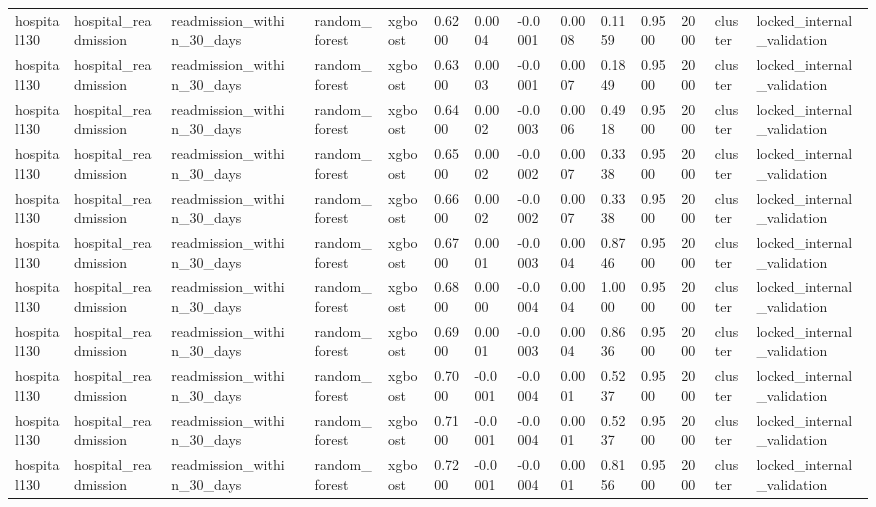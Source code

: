 \begin{tabular}{lllllllllllllll}
hospital130 & hospital\_readmission & readmission\_within\_30\_days &  & random\_forest & xgboost & 0.6200 & 0.0004 & -0.0001 & 0.0008 & 0.1159 & 0.9500 & 2000 & cluster & locked\_internal\_validation \\
hospital130 & hospital\_readmission & readmission\_within\_30\_days &  & random\_forest & xgboost & 0.6300 & 0.0003 & -0.0001 & 0.0007 & 0.1849 & 0.9500 & 2000 & cluster & locked\_internal\_validation \\
hospital130 & hospital\_readmission & readmission\_within\_30\_days &  & random\_forest & xgboost & 0.6400 & 0.0002 & -0.0003 & 0.0006 & 0.4918 & 0.9500 & 2000 & cluster & locked\_internal\_validation \\
hospital130 & hospital\_readmission & readmission\_within\_30\_days &  & random\_forest & xgboost & 0.6500 & 0.0002 & -0.0002 & 0.0007 & 0.3338 & 0.9500 & 2000 & cluster & locked\_internal\_validation \\
hospital130 & hospital\_readmission & readmission\_within\_30\_days &  & random\_forest & xgboost & 0.6600 & 0.0002 & -0.0002 & 0.0007 & 0.3338 & 0.9500 & 2000 & cluster & locked\_internal\_validation \\
hospital130 & hospital\_readmission & readmission\_within\_30\_days &  & random\_forest & xgboost & 0.6700 & 0.0001 & -0.0003 & 0.0004 & 0.8746 & 0.9500 & 2000 & cluster & locked\_internal\_validation \\
hospital130 & hospital\_readmission & readmission\_within\_30\_days &  & random\_forest & xgboost & 0.6800 & 0.0000 & -0.0004 & 0.0004 & 1.0000 & 0.9500 & 2000 & cluster & locked\_internal\_validation \\
hospital130 & hospital\_readmission & readmission\_within\_30\_days &  & random\_forest & xgboost & 0.6900 & 0.0001 & -0.0003 & 0.0004 & 0.8636 & 0.9500 & 2000 & cluster & locked\_internal\_validation \\
hospital130 & hospital\_readmission & readmission\_within\_30\_days &  & random\_forest & xgboost & 0.7000 & -0.0001 & -0.0004 & 0.0001 & 0.5237 & 0.9500 & 2000 & cluster & locked\_internal\_validation \\
hospital130 & hospital\_readmission & readmission\_within\_30\_days &  & random\_forest & xgboost & 0.7100 & -0.0001 & -0.0004 & 0.0001 & 0.5237 & 0.9500 & 2000 & cluster & locked\_internal\_validation \\
hospital130 & hospital\_readmission & readmission\_within\_30\_days &  & random\_forest & xgboost & 0.7200 & -0.0001 & -0.0004 & 0.0001 & 0.8156 & 0.9500 & 2000 & cluster & locked\_internal\_validation \\

\end{tabular}
